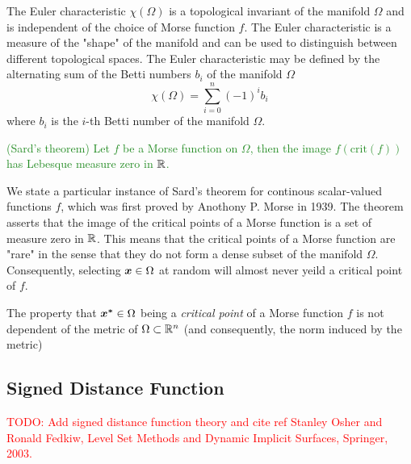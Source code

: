 \documentclass[10pt]{article}
\begin{document}
    \begin{remark}
        The Euler characteristic $\chi(\Omega)$ is a topological invariant of the manifold $\Omega$
        and is independent of the choice of Morse function $f$.
        The Euler characteristic is a measure of the "shape" of the manifold and can be used to
        distinguish between different topological spaces.
        The Euler characteristic may be defined by the alternating sum of the Betti numbers
        $b_i$ of the manifold $\Omega$
        $$
            \chi(\Omega) = \sum_{i=0}^n (-1)^i b_i
        $$
        where $b_i$ is the $i$-th Betti number of the manifold $\Omega$.
    \end{remark}

    \begin{theorem}
        \textcolor{ForestGreen}{
            (Sard's theorem) Let $f$ be a Morse function on $\Omega$, then
            the image $f(\text{crit}(f))$ has Lebesque measure zero in $\mathbb{R}$.
        }
    \end{theorem}

    \begin{remark}
        We state a particular instance of Sard's theorem for continous scalar-valued functions $f$,
        which was first proved by Anothony P. Morse in 1939.
        The theorem asserts that the image of the critical points of a Morse function is a set 
        of measure zero in $\mathbb{R}$. This means that the critical points of a Morse function are "rare" in the sense that they
        do not form a dense subset of the manifold $\Omega$.
        Consequently, selecting $\bm{x} \in \Omega$ at random will almost never yeild a critical
        point of $f$.
    \end{remark}

    \begin{remark}
        The property that $\bm{x^*} \in \Omega$ being a \emph{critical point} of a Morse function $f$ is
        not dependent of the metric of $\Omega \subset \mathbb{R}^n$ (and consequently, the norm induced by the metric)
    \end{remark}



    \subsection{Signed Distance Function}
    \textcolor{Red}{
        TODO: Add signed distance function theory and cite ref
        Stanley Osher and Ronald Fedkiw, Level Set Methods and Dynamic
        Implicit Surfaces, Springer, 2003.
    }
\end{document}
